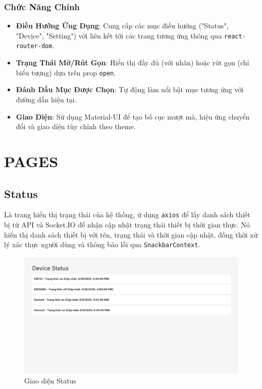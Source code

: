             \subsubsection{Chức Năng Chính}
                \begin{itemize}
                    \item \textbf{Điều Hướng Ứng Dụng}: Cung cấp các mục điều hướng ("Status", "Device", "Setting") với liên kết tới các trang tương ứng thông qua \texttt{react-router-dom}.
                    \item \textbf{Trạng Thái Mở/Rút Gọn}: Hiển thị đầy đủ (với nhãn) hoặc rút gọn (chỉ biểu tượng) dựa trên prop \texttt{open}.
                    \item \textbf{Đánh Dấu Mục Được Chọn}: Tự động làm nổi bật mục tương ứng với đường dẫn hiện tại.
                    \item \textbf{Giao Diện}: Sử dụng Material-UI để tạo bố cục mượt mà, hiệu ứng chuyển đổi và giao diện tùy chỉnh theo theme.
                \end{itemize}
    \section{PAGES}
        \subsection{Status}
            \hspace*{0.6cm}Là trang hiển thị trạng thái của hệ thống, ử dụng \texttt{axios} để lấy danh sách thiết bị từ API và Socket.IO để nhận cập nhật trạng thái thiết bị thời gian thực. Nó hiển thị danh sách thiết bị với tên, trạng thái và thời gian cập nhật, đồng thời xử lý xác thực người dùng và thông báo lỗi qua \texttt{SnackbarContext}.
            \begin{figure}[H]
                \centering
                \includegraphics[width=1\textwidth]{pictures/Status.png}
                \caption{Giao diện Status}
                \label{fig:status}
            \end{figure}
